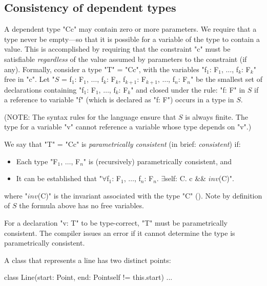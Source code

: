 \subsection{Consistency of dependent types}\label{DepType:Consistency}

A dependent type \xcd"C{c}" may contain zero or more parameters. We require
that a type never be empty---so that it is possible for a variable of
the type to contain a value. This is accomplished by requiring that
the constraint \xcd"c" must be satisfiable {\em regardless} of the value assumed
by parameters to the constraint (if any). Formally, consider a type
\xcd"T" = \xcd"C{c}", with the variables
\xcdmath"f$_1$: F$_1$, $\dots$, f$_k$: F$_k$"
free in \xcd"c".  Let 
\xcdmath"$S$ = {f$_1$: F$_1$, $\dots$, f$_k$: F$_k$, f$_{k+1}$: F$_{k+1}$, $\dots$, f$_n$: F$_n$}"
be the smallest set of
declarations containing
\xcdmath"f$_1$: F$_1$, $\dots$, f$_k$: F$_k$"
and closed under the rule:
\xcd"f: F" in $S$ if a reference to variable \xcd"f" (which
is declared as \xcd"f: F") occurs in a type in $S$.

(NOTE: The syntax rules for the language ensure that $S$ is always
finite. The type for a variable \xcd"v" cannot reference a variable whose
type depends on \xcd"v".)

We say that \xcd"T" = \xcd"C{c}" is {\em parametrically consistent} (in brief:
{\em consistent}) if:

\begin{itemize}
\item Each type \xcdmath"F$_1$, $\dots$, F$_n$" is (recursively) parametrically consistent, and
\item It can be established that
\xcdmath"$\forall$f$_1$: F$_1$, $\dots$, f$_n$: F$_n$. $\exists$self: C. c && $\mathit{inv}$(C)".
\end{itemize}

\noindent
where \xcdmath"$\mathit{inv}$(C)" is the invariant associated
with the type \xcd"C" ().  Note by
definition of $S$ the formula above has no free variables.

\begin{staticrule*}
For a declaration \xcd"v: T" to be type-correct, \xcd"T" must be parametrically
consistent. The compiler issues an error if it cannot determine
the type is parametrically consistent.
\end{staticrule*}

\begin{example}

A class that represents a line has two distinct points:

\begin{xten}
class Line(start: Point, 
           end: Point{self != this.start}) {...}      
\end{xten}
\end{example}

